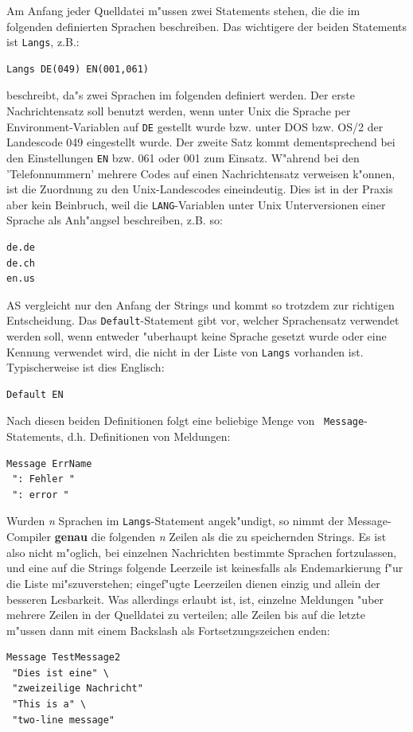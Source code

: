 \documentclass[12pt,a4paper,twoside]{report}
\newcommand{\asname}{AS}
\begin{document}
Am Anfang jeder Quelldatei m"ussen zwei Statements stehen, die die im
folgenden definierten Sprachen beschreiben.  Das wichtigere der beiden
Statements ist {\tt Langs}, z.B.:
\begin{verbatim}
Langs DE(049) EN(001,061)
\end{verbatim}
beschreibt, da"s zwei Sprachen im folgenden definiert werden.  Der erste
Nachrichtensatz soll benutzt werden, wenn unter Unix die Sprache per
Environment-Variablen auf {\tt DE} gestellt wurde bzw. unter DOS bzw. OS/2
der Landescode 049 eingestellt wurde.  Der zweite Satz kommt
dementsprechend bei den Einstellungen {\tt EN} bzw. 061 oder 001 zum
Einsatz.  W"ahrend bei den 'Telefonnummern' mehrere Codes auf einen
Nachrichtensatz verweisen k"onnen, ist die Zuordnung zu den
Unix-Landescodes eineindeutig.  Dies ist in der Praxis aber kein
Beinbruch, weil die {\tt LANG}-Variablen unter Unix Unterversionen einer
Sprache als Anh"angsel beschreiben, z.B. so:
\begin{verbatim}
de.de
de.ch
en.us
\end{verbatim}
\asname{} vergleicht nur den Anfang der Strings und kommt so trotzdem zur
richtigen Entscheidung.
Das {\tt Default}-Statement gibt vor, welcher Sprachensatz verwendet
werden soll, wenn entweder "uberhaupt keine Sprache gesetzt wurde oder
eine Kennung verwendet wird, die nicht in der Liste von {\tt Langs}
vorhanden ist.  Typischerweise ist dies Englisch:
\begin{verbatim}
Default EN
\end{verbatim}
Nach diesen beiden Definitionen folgt eine beliebige Menge von {\tt
Message}-Statements, d.h. Definitionen von Meldungen:
\begin{verbatim}
Message ErrName
 ": Fehler "
 ": error "
\end{verbatim}
Wurden {\em n} Sprachen im {\tt Langs}-Statement angek"undigt, so nimmt
der Message-Compiler {\bf genau} die folgenden {\em n} Zeilen als die zu
speichernden Strings.  Es ist also nicht m"oglich, bei einzelnen
Nachrichten bestimmte Sprachen fortzulassen, und eine auf die Strings
folgende Leerzeile ist keinesfalls als Endemarkierung f"ur die Liste
mi"szuverstehen; eingef"ugte Leerzeilen dienen einzig und allein der
besseren Lesbarkeit.  Was allerdings erlaubt ist, ist, einzelne Meldungen
"uber mehrere Zeilen in der Quelldatei zu verteilen; alle Zeilen bis auf
die letzte m"ussen dann mit einem Backslash als Fortsetzungszeichen enden:
\begin{verbatim}
Message TestMessage2
 "Dies ist eine" \
 "zweizeilige Nachricht"
 "This is a" \
 "two-line message"
\end{verbatim}
\end{document}

